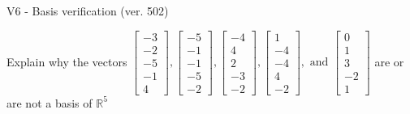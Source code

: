 \begin{exercise}
  \begin{exerciseTitle}V6 - Basis verification (ver. 502)\end{exerciseTitle}
  \begin{exerciseStatement}
    Explain why the vectors \(\left[\begin{array}{r}
-3 \\
-2 \\
-5 \\
-1 \\
4
\end{array}\right] , \left[\begin{array}{r}
-5 \\
-1 \\
-1 \\
-5 \\
-2
\end{array}\right] , \left[\begin{array}{r}
-4 \\
4 \\
2 \\
-3 \\
-2
\end{array}\right] , \left[\begin{array}{r}
1 \\
-4 \\
-4 \\
4 \\
-2
\end{array}\right] , \text{ and } \left[\begin{array}{r}
0 \\
1 \\
3 \\
-2 \\
1
\end{array}\right]\) are or are not a basis of \(\mathbb{R}^5\)	



\end{exerciseStatement}
\end{exercise}
